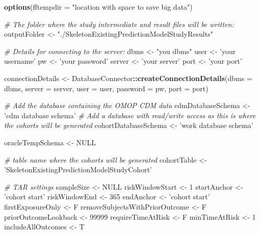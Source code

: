 \documentclass[
]{article}
\newenvironment{Shaded}{\begin{snugshade}}{\end{snugshade}}
\newcommand{\CommentTok}[1]{\textcolor[rgb]{0.56,0.35,0.01}{\textit{#1}}}
\newcommand{\DataTypeTok}[1]{\textcolor[rgb]{0.13,0.29,0.53}{#1}}
\newcommand{\DecValTok}[1]{\textcolor[rgb]{0.00,0.00,0.81}{#1}}
\newcommand{\KeywordTok}[1]{\textcolor[rgb]{0.13,0.29,0.53}{\textbf{#1}}}
\newcommand{\NormalTok}[1]{#1}
\newcommand{\OperatorTok}[1]{\textcolor[rgb]{0.81,0.36,0.00}{\textbf{#1}}}
\newcommand{\OtherTok}[1]{\textcolor[rgb]{0.56,0.35,0.01}{#1}}
\newcommand{\StringTok}[1]{\textcolor[rgb]{0.31,0.60,0.02}{#1}}
\begin{document}
\begin{Shaded}
\begin{Highlighting}[]
\KeywordTok{options}\NormalTok{(}\DataTypeTok{fftempdir =} \StringTok{"location with space to save big data"}\NormalTok{)}

\CommentTok{# The folder where the study intermediate and result files will be written:}
\NormalTok{outputFolder <-}\StringTok{ "./SkeletonExistingPredictionModelStudyResults"}

\CommentTok{# Details for connecting to the server:}
\NormalTok{dbms <-}\StringTok{ "you dbms"}
\NormalTok{user <-}\StringTok{ 'your username'}
\NormalTok{pw <-}\StringTok{ 'your password'}
\NormalTok{server <-}\StringTok{ 'your server'}
\NormalTok{port <-}\StringTok{ 'your port'}

\NormalTok{connectionDetails <-}\StringTok{ }\NormalTok{DatabaseConnector}\OperatorTok{::}\KeywordTok{createConnectionDetails}\NormalTok{(}\DataTypeTok{dbms =}\NormalTok{ dbms,}
                                                                \DataTypeTok{server =}\NormalTok{ server,}
                                                                \DataTypeTok{user =}\NormalTok{ user,}
                                                                \DataTypeTok{password =}\NormalTok{ pw,}
                                                                \DataTypeTok{port =}\NormalTok{ port)}

\CommentTok{# Add the database containing the OMOP CDM data}
\NormalTok{cdmDatabaseSchema <-}\StringTok{ 'cdm database schema'}
\CommentTok{# Add a database with read/write access as this is where the cohorts will be generated}
\NormalTok{cohortDatabaseSchema <-}\StringTok{ 'work database schema'}

\NormalTok{oracleTempSchema <-}\StringTok{ }\OtherTok{NULL}

\CommentTok{# table name where the cohorts will be generated}
\NormalTok{cohortTable <-}\StringTok{ 'SkeletonExistingPredictionModelStudyCohort'}

\CommentTok{# TAR settings}
\NormalTok{sampleSize <-}\StringTok{ }\OtherTok{NULL}
\NormalTok{riskWindowStart <-}\StringTok{ }\DecValTok{1}
\NormalTok{startAnchor <-}\StringTok{ 'cohort start'}
\NormalTok{riskWindowEnd <-}\StringTok{ }\DecValTok{365}
\NormalTok{endAnchor <-}\StringTok{ 'cohort start'}
\NormalTok{firstExposureOnly <-}\StringTok{ }\NormalTok{F}
\NormalTok{removeSubjectsWithPriorOutcome <-}\StringTok{ }\NormalTok{F}
\NormalTok{priorOutcomeLookback <-}\StringTok{ }\DecValTok{99999}
\NormalTok{requireTimeAtRisk <-}\StringTok{ }\NormalTok{F}
\NormalTok{minTimeAtRisk <-}\StringTok{ }\DecValTok{1}
\NormalTok{includeAllOutcomes <-}\StringTok{ }\NormalTok{T}



\end{Highlighting}
\end{Shaded}
\end{document}
